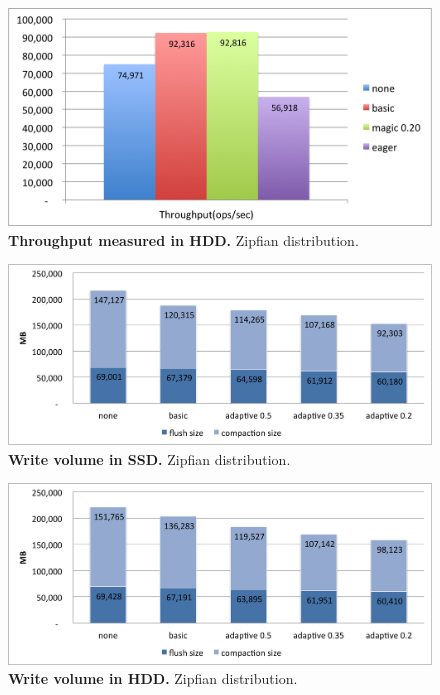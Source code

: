 {\begin{figure}[htb]
\includegraphics[width=\figw]{Figs/throughput-hdd.png}
\caption{{\bf  Throughput measured in HDD.} Zipfian distribution. 
}
\label{fig:throughput-hdd}
\end{figure}




\begin{figure}[htb]
\includegraphics[width=\figw]{Figs/volume-ssd.png}
\caption{{\bf  Write volume in SSD.} Zipfian distribution.
}
\label{fig:volume-ssd}
\end{figure}

\begin{figure}[htb]
\includegraphics[width=\figw]{Figs/volume-hdd.png}
\caption{{\bf  Write volume in HDD.} Zipfian distribution.
}
\label{fig:volume-hdd}
\end{figure}

}
